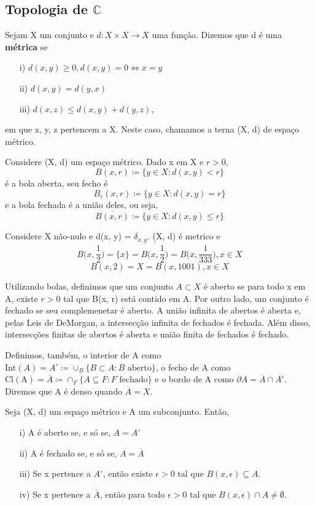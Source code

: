 \documentclass[complex.tex]{subfiles}
\begin{document}
\subsection{Topologia de $\mathbb{C}$}
\begin{def*}
	Sejam X um conjunto e $d:X\times{X}\rightarrow X$ uma função. Dizemos que d é uma \textbf{métrica} se
	\begin{itemize}
		\item[i)] $d(x, y) \geq{0}, d(x, y) = 0\Longleftrightarrow x=y$
		\item[ii)] $d(x, y) = d(y, x)$
		\item[iii)] $d(x, z) \leq d(x, y) + d(y, z)$,
	\end{itemize}
	em que x, y, z pertencem a X. Neste caso, chamamos a terna (X, d) de espaço métrico.
\end{def*}
Considere (X, d) um espaço métrico. Dado x em X e $r > 0$,
$$
	B(x, r)\coloneqq  \{y\in{X}: d(x, y)< r\}
$$
é a bola aberta, seu fecho é
$$
	B_c(x, r)\coloneqq  \{y\in{X}: d(x, y) = r\}
$$
e a bola fechada é a união deles, ou seja,
$$
	\overline{B(x, r)}\coloneqq  \{y\in{X}: d(x, y) \leq{r}\}
$$
\begin{example}
	Considere X não-nulo e d(x, y) = $\delta _{x,y}.$ (X, d) é metrico e
	$$
		B\biggl(x, \frac{1}{2}\biggr) = \{x\} = \overline{B\biggl(x, \frac{1}{2}\biggr)} = B\biggl(x, \frac{1}{333}\biggr), x\in{X}
	$$
	$$
		B(x, 2) = X = B(x, 1001), x\in{X}
	$$
\end{example}
Utilizando bolas, definimos que um conjunto $A\subset{X}$ é aberto se para todo x em A, existe $r > 0$ tal que
B(x, r) está contido em A. Por outro lado, um conjunto é fechado se seu complemenetar é aberto. A união infinita
de abertos é aberta e, pelas Leis de DeMorgan, a intersecção infinita de fechados é fechada. Além disso, intersecções
finitas de abertos é aberta e união finita de fechados é fechado.

Definimos, também, o interior de A como $\mathrm{Int}(A) = A^{\circ}\coloneqq  \cup_{B} \{B\subset{A}: B \text{ aberto}\}$, o fecho de A
como $\mathrm{Cl(A)} = \overline{A} \coloneqq  \cap_{F} \{A\subseteq{F}: F \text{ fechado}\}$ e o bordo de A como $\partial{A} = \overline{A}\cap\overline{A^c}.$
Diremos que A é denso quando $\overline{A} = X.$
\begin{prop*}
	Seja (X, d) um espaço métrico e A um subconjunto. Então,
	\begin{itemize}
		\item[i)] A é aberto se, e só se, $A = A^{\circ}$
		\item[ii)] A é fechado se, e só se, $A = \overline{A}$
		\item[iii)] Se x pertence a $A^{\circ}$, então existe $\epsilon>0$ tal que $B(x, \epsilon)\subseteq{A}$.
		\item[iv)] Se x pertence a $\overline{A}$, então para todo $\epsilon > 0$ tal que $B(x, \epsilon)\cap{A}\neq\emptyset$.
	\end{itemize}
\end{prop*}
\end{document}
